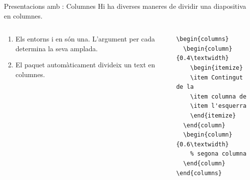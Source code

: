 \begin{frame}[fragile]{Presentacions amb \protect{}: Columnes}
Hi ha diverses maneres de dividir una diapositiva en columnes.
\begin{columns}
\begin{column}{0.4\textwidth}
\begin{enumerate}
\item Els entorns  i  en són una.
      L'argument per cada  determina la seva amplada. 
\item El paquet  automàticament divideix un text en columnes. 
\end{enumerate}
\end{column}
\begin{column}{0.6\textwidth}
\begin{verbatim}
\begin{columns}
  \begin{column}{0.4\textwidth}
    \begin{itemize}
    \item Contingut de la  
    \item columna de  
    \item l'esquerra 
    \end{itemize}
  \end{column}
  \begin{column}{0.6\textwidth}
    % segona columna 
  \end{column}
\end{columns}
\end{verbatim}
\end{column}
\end{columns}
\end{frame}

